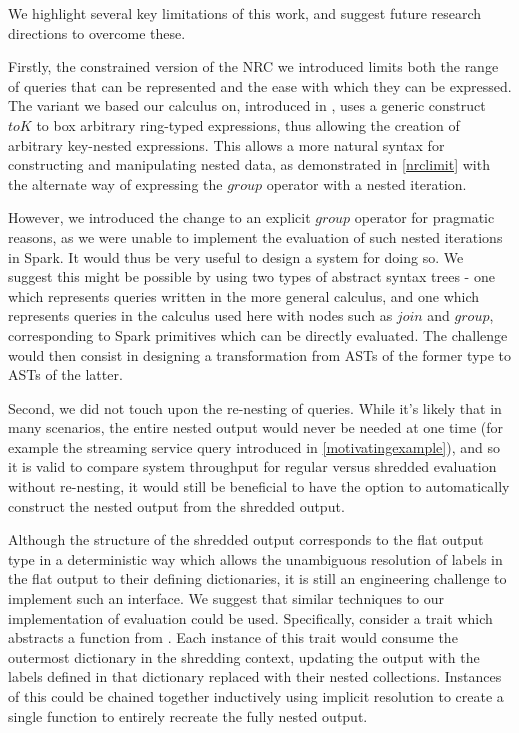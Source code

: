 We highlight several key limitations of this work, and suggest future research directions to overcome these.

\vs Firstly, the constrained version of the NRC we introduced limits both the range of queries that can be represented and the ease with which they can be expressed.  The variant we based our calculus on, introduced in \cite{draftpaper}, uses a generic construct $toK$ to box arbitrary ring-typed expressions, thus allowing the creation of arbitrary key-nested expressions. This allows a more natural syntax for constructing and manipulating nested data, as demonstrated in \ref{nrclimit} with the alternate way of expressing the $group$ operator with a nested iteration.

However, we introduced the change to an explicit $group$ operator for pragmatic reasons, as we were unable to implement the evaluation of such nested iterations in Spark. It would thus be very useful to design a system for doing so. We suggest this might be possible by using two types of abstract syntax trees - one which represents queries written in the more general calculus, and one which represents queries in the calculus used here with nodes such as $join$ and $group$, corresponding to Spark primitives which can be directly evaluated. The challenge would then consist in designing a transformation from ASTs of the former type to ASTs of the latter.

\vs Second, we did not touch upon the re-nesting of queries. While it's likely that in many scenarios, the entire nested output would never be needed at one time (for example the streaming service query introduced in \ref{motivatingexample}), and so it is valid to compare system throughput for regular versus shredded evaluation without re-nesting, it would still be beneficial to have the option to automatically construct the nested output from the shredded output.

Although the structure of the shredded output corresponds to the flat output type in a deterministic way which allows the unambiguous resolution of labels in the flat output to their defining dictionaries, it is still an engineering challenge to implement such an interface. We suggest that similar techniques to our implementation of evaluation could be used. Specifically, consider a trait which abstracts a function from . Each instance of this trait would consume the outermost dictionary in the shredding context, updating the output with the labels defined in that dictionary replaced with their nested collections. Instances of this could be chained together inductively using implicit resolution to create a single function to entirely recreate the fully nested output.

